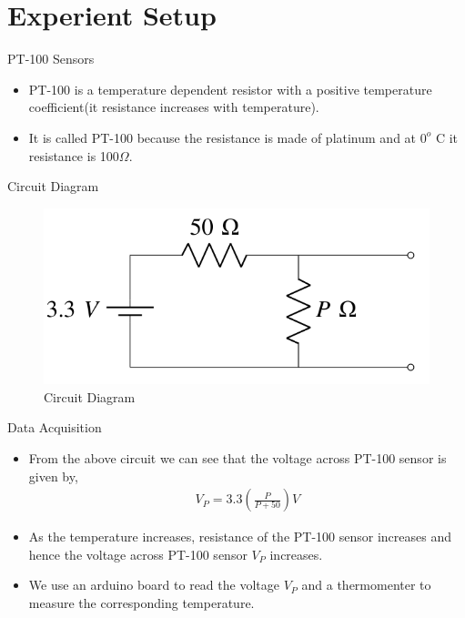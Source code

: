 \documentclass{beamer}
\providecommand{\brak}[1]{\ensuremath{\left(#1\right)}}
\theoremstyle{remark}
\begin{document}
\section{Experient Setup}
\begin{frame}{PT-100 Sensors}
	\begin{itemize}
		\item PT-100 is a temperature dependent resistor with a positive temperature coefficient(it resistance increases with temperature).
		\item It is called PT-100 because the resistance is made of platinum and at $0^{o}$ C it resistance is 100$\Omega$.
	\end{itemize}
\end{frame}
\begin{frame}{Circuit Diagram}
	\begin{figure}[!ht]
    \centering
    \includegraphics[width=0.6\columnwidth]{figs/Circuit Diagram.png}
    \caption{Circuit Diagram}
    \label{fig:Circuit}
	\end{figure}
\end{frame}
\begin{frame}{Data Acquisition}
	\begin{itemize}
		\item From the above circuit we can see that the voltage across PT-100 sensor is given by,
		\begin{align}
			V_P = 3.3\brak{\frac{P}{P+50}}V
		\end{align} 
		\item As the temperature increases, resistance of the PT-100 sensor increases and hence the voltage across PT-100 sensor $V_P$ increases.
		\item We use an arduino board to read the voltage $V_P$ and a thermomenter to measure the corresponding temperature.
	\end{itemize}
\end{frame}
\end{document}
